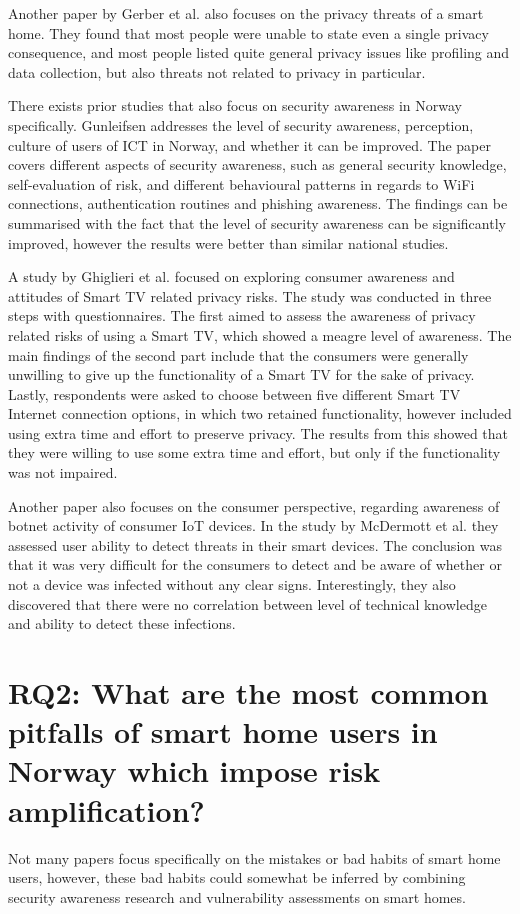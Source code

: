 Another paper by Gerber et al. \cite{Gerber2018} also focuses on the privacy threats of a smart home. They found that most people were unable to state even a single privacy consequence, and most people listed quite general privacy issues like profiling and data collection, but also threats not related to privacy in particular. 

There exists prior studies that also focus on security awareness in Norway specifically. Gunleifsen \cite{GunleifsenHakon2018Csaa} addresses the level of security awareness, perception, culture of users of ICT in Norway, and whether it can be improved. The paper covers different aspects of security awareness, such as general security knowledge, self-evaluation of risk, and different behavioural patterns in regards to WiFi connections, authentication routines and phishing awareness. The findings can be summarised with the fact that the level of security awareness can be significantly improved, however the results were better than similar national studies. 

A study by Ghiglieri et al. \cite{Ghiglieri2017} focused on exploring consumer awareness and attitudes of Smart TV related privacy risks. The study was conducted in three steps with questionnaires. The first aimed to assess the awareness of privacy related risks of using a Smart TV, which showed a meagre level of awareness. The main findings of the second part include that the consumers were generally unwilling to give up the functionality of a Smart TV for the sake of privacy. Lastly, respondents were asked to choose between five different Smart
TV Internet connection options, in which two retained functionality, however included using extra time and effort to preserve privacy. The results from this showed that they were willing to use some extra time and effort, but only if the functionality was not impaired. 

Another paper also focuses on the consumer perspective, regarding awareness of botnet activity of consumer IoT devices. In the study by McDermott et al. \cite{McDermott2019} they assessed user ability to detect threats in their smart devices. The conclusion was that it was very difficult for the consumers to detect and be aware of whether or not a device was infected without any clear signs. Interestingly, they also discovered that there were no correlation between level of technical knowledge and ability to detect these infections. 



\section{RQ2: What are the most common pitfalls of smart home users in Norway which impose risk amplification?}
Not many papers focus specifically on the mistakes or bad habits of smart home users, however, these bad habits could somewhat be inferred by combining security awareness research and vulnerability assessments on smart homes.

